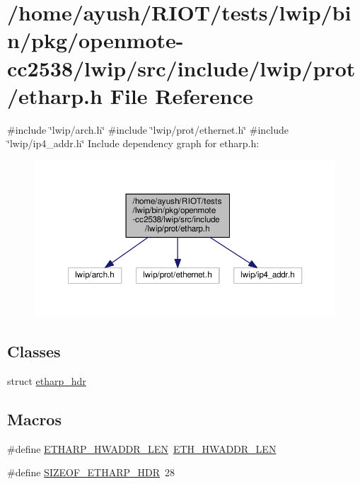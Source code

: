 \hypertarget{openmote-cc2538_2lwip_2src_2include_2lwip_2prot_2etharp_8h}{}\section{/home/ayush/\+R\+I\+O\+T/tests/lwip/bin/pkg/openmote-\/cc2538/lwip/src/include/lwip/prot/etharp.h File Reference}
\label{openmote-cc2538_2lwip_2src_2include_2lwip_2prot_2etharp_8h}
{\ttfamily \#include \char`\"{}lwip/arch.\+h\char`\"{}}\newline
{\ttfamily \#include \char`\"{}lwip/prot/ethernet.\+h\char`\"{}}\newline
{\ttfamily \#include \char`\"{}lwip/ip4\+\_\+addr.\+h\char`\"{}}\newline
Include dependency graph for etharp.\+h\+:
\nopagebreak
\begin{figure}[H]
\begin{center}
\leavevmode
\includegraphics[width=350pt]{openmote-cc2538_2lwip_2src_2include_2lwip_2prot_2etharp_8h__incl}
\end{center}
\end{figure}
\subsection*{Classes}
\begin{DoxyCompactItemize}
\item 
struct \hyperlink{structetharp__hdr}{etharp\+\_\+hdr}
\end{DoxyCompactItemize}
\subsection*{Macros}
\begin{DoxyCompactItemize}
\item 
\#define \hyperlink{openmote-cc2538_2lwip_2src_2include_2lwip_2prot_2etharp_8h_a2c9ac5fe1c9f387f0df94d90cdc9c5c8}{E\+T\+H\+A\+R\+P\+\_\+\+H\+W\+A\+D\+D\+R\+\_\+\+L\+EN}~\hyperlink{openmote-cc2538_2lwip_2src_2include_2lwip_2prot_2ethernet_8h_ac9426049770b40fcd9556ffbd7e56907}{E\+T\+H\+\_\+\+H\+W\+A\+D\+D\+R\+\_\+\+L\+EN}
\item 
\#define \hyperlink{openmote-cc2538_2lwip_2src_2include_2lwip_2prot_2etharp_8h_a58f300020d1e3a91cad207410a2a82ab}{S\+I\+Z\+E\+O\+F\+\_\+\+E\+T\+H\+A\+R\+P\+\_\+\+H\+DR}~28
\end{DoxyCompactItemize}

